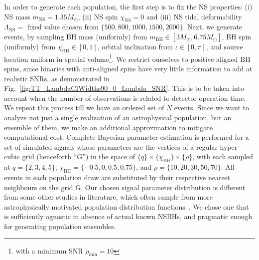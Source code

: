 \documentclass[aps,prd,amsmath,floats,floatfix, twocolumn,
superscriptaddress,nofootinbib,showpacs]{revtex4-1}
\newcommand{\lambdans}{\Lambda_\mathrm{NS}}
\newcommand{\chibh}{\chi_\mathrm{BH}}
\newcommand{\chins}{\chi_\mathrm{NS}}
\newcommand{\mbh}{m_\mathrm{BH}}
\newcommand{\mns}{m_\mathrm{NS}}
\begin{document}
In order to generate each population, the first step is to fix
the NS properties: (i) NS mass $\mns=1.35M_\odot$, (ii) NS spin $\chins=0$
and (iii) NS tidal deformability $\lambdans=$ fixed value chosen from
$\{500,800,1000,1500,2000\}$. Next, we generate events, by sampling BH mass
(uniformly) from $\mbh\in[3M_\odot,6.75M_\odot]$, BH spin (uniformly)
from $\chibh\in[0, 1]$, orbital inclination from $\iota\in[0,\pi]$, and 
source location uniform in spatial volume\footnote{with a minimum SNR 
$\rho_\mathrm{min}=10$}.
% 
We restrict ourselves to positive aligned BH spins, since binaries with
anti-aligned spins have very little information to add at realistic SNRs,
as demonstrated in Fig.~\ref{fig:TT_LambdaCIWidths90_0_Lambda_SNR}. This is
to be taken into account when the number of observations is related to detector
operation time. 
% 
We repeat this process till we have an ordered set of $N$ events.
% 
Since we want to analyze not just a single realization of an astrophysical
population, but an ensemble of them, we make an additional approximation to
mitigate computational cost. Complete Bayesian parameter estimation is
performed for a set of simulated signals whose parameters are the vertices
of a regular hyper-cubic grid (henceforth ``G'') in the space of
$\{q\}\times\{\chibh\}\times\{\rho\}$, with each sampled at $q=\{2,3,4,5\}$,
$\chibh=\{-0.5,0,0.5,0.75\}$, and $\rho=\{10,20,30,50,70\}$.
All events in each population draw are substituted by their respective nearest
neighbours on the grid G.
% 
Our chosen signal parameter distribution is different from some other studies
in literature, which often sample from more astrophysically motivated population
distribution functions~\cite{Mandel:2009pc}. We chose one that is sufficiently
agnostic in absence of actual known NSBHs, and pragmatic enough for generating
population ensembles.
\end{document}
